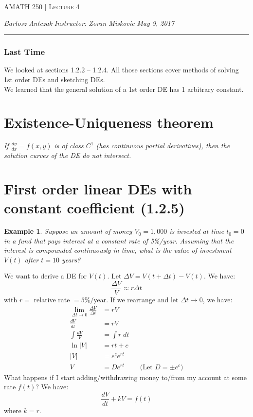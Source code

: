 \documentclass{report}
\newcommand{\lectureNum}{4}
\newcommand{\curDate}{May 9, 2017}
\newcommand{\course}{AMATH 250}
\newcommand{\instructor}{Zoran Miskovic}
\newtheorem{ex}{Example}[section]
\begin{document}
\begin{center}
\begin{Large}
\textsc{\course{} | Lecture \lectureNum{}}
\end{Large}
\end{center} 
\noindent \textit{Bartosz Antczak} \hfill
\textit{Instructor: \instructor{}} \hfill
\textit{\curDate{}}
\rule{\textwidth}{0.4pt}
\subsubsection{Last Time}
We looked at sections 1.2.2 -- 1.2.4. All those sections cover methods of solving 1st order DEs and sketching DEs. \\
We learned that the general solution of a 1st order DE has 1 arbitrary constant.
\section{Existence-Uniqueness theorem}
\begin{center}
    \textit{If $\frac{dy}{dx} = f(x,y)$ is of class $C^1$ (has continuous partial derivatives), then the solution curves of the DE do not intersect.}
\end{center}
\section{First order linear DEs with constant coefficient (1.2.5)}
\begin{ex}
Suppose an amount of money $V_0 = 1,000$ is invested at time $t_0 = 0$ in a fund that pays interest at a constant rate of 5\%/year. Assuming that the interest is compounded continuously in time, what is the value of investment $V(t)$ after $t=10$ years?
\end{ex}
\noindent We want to derive a DE for $V(t)$. Let $\Delta V = V(t + \Delta t) - V(t)$. We have:
$$\frac{\Delta V}{V} \approx r \Delta t$$
with $r = $ relative rate $= 5\% / $year.
If we rearrange and let $\Delta t \to 0$, we have:
\begin{align}
    \lim_{\Delta t \to 0} \frac{\Delta V}{\Delta t} &= r V \\
    \frac{dV}{dt} &= rV \\
    \int \frac{dV}{V} &= \int r \; dt\\
    \ln |V| &= rt + c \\
    |V| &= e^ce^{rt} \\
    V &= De^{rt} && \text{(Let }D = \pm e^c)
\end{align}
What happens if I start adding/withdrawing money to/from my account at some rate $f(t)$? We have:
$$\frac{dV}{dt} + kV = f(t)$$
where $k = r$.
\end{document}
